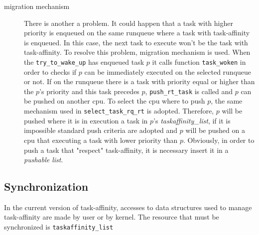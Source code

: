 \begin{description}
\item[migration mechanism] There is another a problem. It could happen that a task with higher priority is enqueued on the same runqueue where a task with 
task-affinity is enqueued. In this case, the next task to execute won't be the task with task-affinity.
To resolve this problem, migration mechanism is used. When the \texttt{try\_to\_wake\_up} has enqueued task $p$ it calls function \texttt{task\_woken} in 
order to checks if $p$ can be immediately executed on the selected runqueue or not. If on the runqueue there is a task with priority equal or higher than 
the $p$'s priority and this task precedes $p$, \texttt{push\_rt\_task} is called and $p$ can be pushed on another cpu. To select the cpu where to push $p$, 
the same mechanism used in \texttt{select\_task\_rq\_rt} is adopted. Therefore, $p$ will be pushed where it is in execution a task in $p$'s 
\textit{taskaffinity\_list}, if it is impossible standard push criteria are adopted and $p$ will be pushed on a cpu that executing a task with lower 
priority than $p$. Obviously, in order to push a task that "respect" task-affinity, it is necessary insert it in a \textit{pushable list}. 

\end{description}
\subsection{Synchronization}

In the current version of task-affinity, accesses to data structures used to manage task-affinity are made by user or by kernel. The resource that must be
synchronized is \texttt{taskaffinity\_list}

